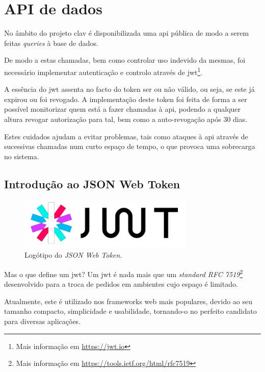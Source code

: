 \cleardoublepage
\section{API de dados}

No âmbito do projeto \gls{clav} é disponibilizada uma \gls{api} pública de modo a serem feitas \emph{queries} à base de dados.

De modo a estas chamadas, bem como controlar uso indevido da mesmas, foi necessário implementar autenticação e controlo através de \gls{jwt}\footnote{Mais informação em \url{https://jwt.io}}.

A essência do \gls{jwt} assenta no facto do token ser ou não válido, ou seja, se este já expirou ou foi revogado. A implementação deste token foi feita de forma a ser possível monitorizar quem está a fazer chamadas à \gls{api}, podendo a qualquer altura revogar autorização para tal, bem como a auto-revogação após 30 dias.

Estes cuidados ajudam a evitar problemas, tais como ataques à \gls{api} através de sucessivas chamadas num curto espaço de tempo, o que provoca uma sobrecarga no sistema.

\subsection{Introdução ao JSON Web Token}

\begin{figure}[h]
    \centering
    \includegraphics[width=0.75\textwidth]{img/jwt/jwtlogo.png}
    \caption{Logótipo do \emph{JSON Web Token}. \cite{jwtLogo}}
\end{figure}

Mas o que define um \gls{jwt}? Um \gls{jwt} é nada mais que um \emph{standard RFC 7519}\cite{jones2015json}\cite{peyrott2016jwt}\footnote{Mais informação em \url{https://tools.ietf.org/html/rfc7519}} desenvolvido para a troca de pedidos em ambientes cujo espaço é limitado. 

Atualmente, este é utilizado nos frameworks web mais populares, devido ao seu tamanho compacto, simplicidade e usabilidade, tornando-o no perfeito candidato para diversas aplicações.

